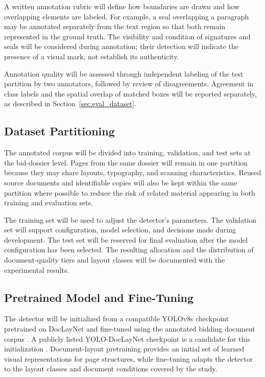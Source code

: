 A written annotation rubric will define how boundaries are drawn and how overlapping elements are labeled. For example, a seal overlapping a paragraph may be annotated separately from the text region so that both remain represented in the ground truth. The visibility and condition of signatures and seals will be considered during annotation; their detection will indicate the presence of a visual mark, not establish its authenticity.

Annotation quality will be assessed through independent labeling of the test partition by two annotators, followed by review of disagreements. Agreement in class labels and the spatial overlap of matched boxes will be reported separately, as described in Section~\ref{sec:eval_dataset}.

\subsection{Dataset Partitioning}
\label{sec:training_partition}

The annotated corpus will be divided into training, validation, and test sets at the bid-dossier level. Pages from the same dossier will remain in one partition because they may share layouts, typography, and scanning characteristics. Reused source documents and identifiable copies will also be kept within the same partition where possible to reduce the risk of related material appearing in both training and evaluation sets.

The training set will be used to adjust the detector's parameters. The validation set will support configuration, model selection, and decisions made during development. The test set will be reserved for final evaluation after the model configuration has been selected. The resulting allocation and the distribution of document-quality tiers and layout classes will be documented with the experimental results.

\subsection{Pretrained Model and Fine-Tuning}
\label{sec:training_finetuning}

The detector will be initialized from a compatible YOLOv8s checkpoint pretrained on DocLayNet and fine-tuned using the annotated bidding document corpus \cite{ref9,ref30}. A publicly listed YOLO-DocLayNet checkpoint is a candidate for this initialization \cite{docxc1}. Document-layout pretraining provides an initial set of learned visual representations for page structures, while fine-tuning adapts the detector to the layout classes and document conditions covered by the study.

